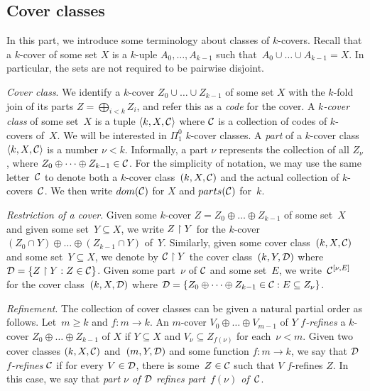 \subsection{Cover classes}

In this part, we introduce some terminology about classes of $k$-covers.
Recall that a $k$-cover of some set $X$ is a $k$-uple $A_0, \dots, A_{k-1}$ such that~$A_0 \cup \dots \cup A_{k-1} = X$.
In particular, the sets are not required to be pairwise disjoint.

\smallskip
\emph{Cover class}.
We identify a $k$-cover $Z_0 \cup \dots \cup Z_{k-1}$ of some set $X$ with the $k$-fold join of its parts
$Z = \bigoplus_{i < k} Z_i$, and refer this as a \emph{code} for the cover.
A \emph{$k$-cover class} of some set~$X$ is a tuple $\left\langle k, X, \mathcal{C} \right\rangle$
where $\mathcal{C}$ is a collection of codes of $k$-covers of~$X$. 
We will be interested in $\Pi^0_1$ $k$-cover classes.
A \emph{part} of a $k$-cover class $\left\langle k, X, \mathcal{C} \right\rangle$ is a number $\nu < k$. Informally, a part $\nu$
represents the collection of all $Z_\nu$, where $Z_0 \oplus \dots \oplus Z_{k-1} \in \mathcal{C}$.
For the simplicity of notation, we may use the same letter~$\mathcal{C}$ to denote both a $k$-cover class~$(k, X, \mathcal{C})$
and the actual collection of $k$-covers~$\mathcal{C}$. We then write $dom(\mathcal{C})$ for $X$
and $parts(\mathcal{C})$ for~$k$.

\smallskip
\emph{Restriction of a cover}. Given some $k$-cover $Z = Z_0 \oplus \dots \oplus Z_{k-1}$ of some set~$X$ and given some set~$Y \subseteq X$, we write $Z \upharpoonright Y$ for the $k$-cover $(Z_0 \cap Y) \oplus \dots \oplus (Z_{k-1} \cap Y)$ of~$Y$.
Similarly, given some cover class~$(k, X, \mathcal{C})$ and some set~$Y \subseteq X$, we denote by $\mathcal{C} \upharpoonright Y$
the cover class~$(k, Y, \mathcal{D})$ where $\mathcal{D} = \{ Z \upharpoonright Y : Z \in \mathcal{C} \}$.
Given some part~$\nu$ of $\mathcal{C}$ and some set~$E$, we write~$\mathcal{C}^{[\nu, E]}$
for the cover class~$(k, X, \mathcal{D})$ where 
$\mathcal{D} = \{ Z_0 \oplus \dots \oplus Z_{k-1} \in \mathcal{C} : E \subseteq Z_\nu \}$.

\smallskip
\emph{Refinement}. The collection of cover classes can be given a natural partial order as follows.
Let~$m \geq k$ and $f : m \to k$. An $m$-cover $V_0 \oplus \dots \oplus V_{m-1}$ of $Y$ \emph{$f$-refines}
a $k$-cover $Z_0 \oplus \dots \oplus Z_{k-1}$ of $X$ if $Y \subseteq X$ and $V_\nu \subseteq Z_{f(\nu)}$ for each~$\nu < m$.
Given two cover classes $(k, X, \mathcal{C})$ and~$(m, Y, \mathcal{D})$
and some function $f : m \to k$, we say that $\mathcal{D}$ \emph{$f$-refines} $\mathcal{C}$
if for every $V \in \mathcal{D}$, there is some~$Z \in \mathcal{C}$ such that $V$ $f$-refines $Z$.
In this case, we say that \emph{part $\nu$ of $\mathcal{D}$ refines part~$f(\nu)$ of~$\mathcal{C}$}.

